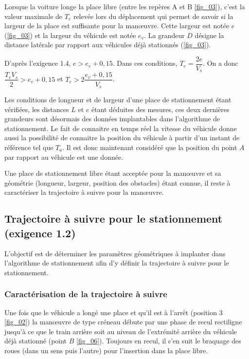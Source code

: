 Lorsque la voiture longe la place libre (entre les repères A et B \autoref{fig_03}), c’est la valeur maximale de $T_e$ relevée
lors du déplacement qui permet de savoir si la largeur de la place est suffisante pour la manœuvre. Cette largeur
est notée $e$ (\autoref{fig_03}) et la largeur du véhicule est notée $e_v$. La grandeur $D$ désigne la distance latérale par rapport aux véhicules déjà stationnés (\autoref{fig_03}).

\ifprof
\begin{corrige}
D'après l'exigence 1.4, $e>e_v + 0,15$.
Dans ces conditions, $T_e = \dfrac{2e}{V_s}$.
On a donc $\dfrac{T_e V_s}{2}>e_v + 0,15$ et $T_e>2\dfrac{e_v + 0,15}{V_s}$.


\end{corrige}
\else
\fi


Les conditions de longueur et de largeur d’une place de stationnement étant vérifiées, les distances $L$ et $e$ étant déduites des mesures, ces deux dernières grandeurs sont désormais des données implantables dans l’algorithme de stationnement. Le fait de connaitre en temps réel la vitesse du véhicule donne aussi la possibilité de connaitre la position du véhicule à partir d’un instant de référence tel que $T_a$. Il est donc maintenant considéré que la
position du point $A$ par rapport au véhicule est une donnée.

Une place de stationnement libre étant acceptée pour la manœuvre et sa géométrie (longueur, largeur, position
des obstacles) étant connue, il reste à caractériser la trajectoire à suivre pour la manœuvre.

\subsection{Trajectoire à suivre pour le stationnement (exigence 1.2)}

\begin{obj}
L’objectif est de déterminer les paramètres géométriques à implanter dans l’algorithme de stationnement afin d’y définir la trajectoire à suivre pour le stationnement.
\end{obj}

\subsubsection{Caractérisation de la trajectoire à suivre}
Une fois que le véhicule a longé une place et qu’il est à l’arrêt (position 3 \autoref{fig_02}) la manœuvre de type créneau
débute par une phase de recul rectiligne jusqu’à ce que le train arrière soit au niveau de l’extrémité arrière du
véhicule déjà stationné (point $B$ \autoref{fig_06}). Toujours en recul, il s’en suit le braquage des roues (dans un sens
puis l’autre) pour l’insertion dans la place libre.

